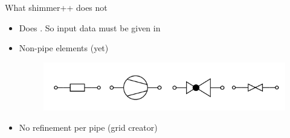 \begin{frame}{What shimmer++ does not}

\begin{itemize}

    \item Does . So input data must be given in 
    \item Non-pipe elements (yet)
    \begin{figure}
        \centering
    \includegraphics[scale = 0.5]{img_other/non_pipe_elements.png}
    \end{figure}
    \item No refinement per pipe (grid creator)
    \begin{center}            
    \end{center}

\end{itemize}   
\end{frame}

